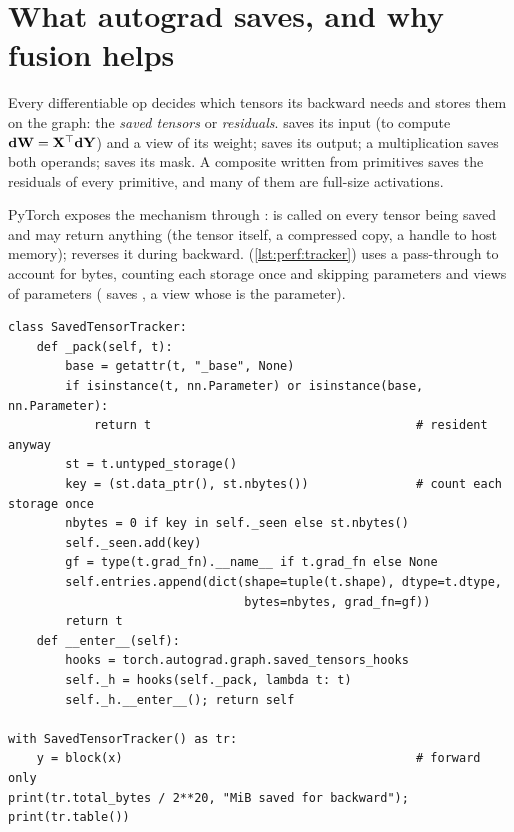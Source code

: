 \section{What autograd saves, and why fusion helps}\label{sec:perf:residuals}

Every differentiable op decides which tensors its backward needs and stores them on the graph:
the \emph{saved tensors} or \emph{residuals}.  saves its input (to compute
$\mathbf{dW}=\mathbf{X}^\top\mathbf{dY}$) and a view of its weight;  saves its output; a
multiplication saves both operands;  saves its mask. A composite written from
primitives saves the residuals of every primitive, and many of them are full-size activations.

PyTorch exposes the mechanism through :  is called on every tensor being saved and may return anything (the tensor
itself, a compressed copy, a handle to host memory);  reverses it during backward.
 (\cref{lst:perf:tracker}) uses a pass-through  to account for
bytes, counting each storage once and skipping parameters and views of parameters (
saves , a view whose  is the parameter).

\begin{lstlisting}[caption={Accounting for residuals with saved-tensor hooks (abridged from \texttt{llmsys/perf.py}).},label={lst:perf:tracker}]
class SavedTensorTracker:
    def _pack(self, t):
        base = getattr(t, "_base", None)
        if isinstance(t, nn.Parameter) or isinstance(base, nn.Parameter):
            return t                                     # resident anyway
        st = t.untyped_storage()
        key = (st.data_ptr(), st.nbytes())               # count each storage once
        nbytes = 0 if key in self._seen else st.nbytes()
        self._seen.add(key)
        gf = type(t.grad_fn).__name__ if t.grad_fn else None
        self.entries.append(dict(shape=tuple(t.shape), dtype=t.dtype,
                                 bytes=nbytes, grad_fn=gf))
        return t
    def __enter__(self):
        hooks = torch.autograd.graph.saved_tensors_hooks
        self._h = hooks(self._pack, lambda t: t)
        self._h.__enter__(); return self

with SavedTensorTracker() as tr:
    y = block(x)                                         # forward only
print(tr.total_bytes / 2**20, "MiB saved for backward"); print(tr.table())
\end{lstlisting}


